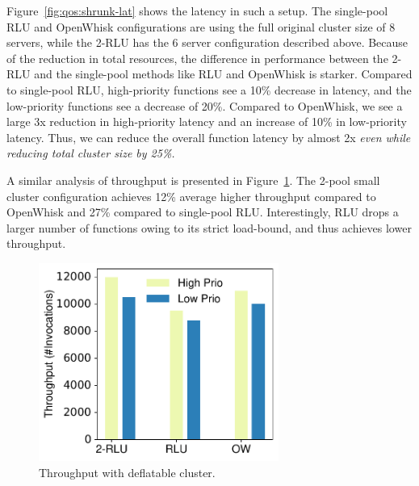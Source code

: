 Figure~\ref{fig:qos:shrunk-lat} shows the latency in such a setup.
The single-pool RLU and OpenWhisk configurations are using the full original cluster size of 8 servers, while the 2-RLU has the 6 server configuration described above. 
Because of the reduction in total resources, the difference in performance between the 2-RLU and the single-pool methods like RLU and OpenWhisk is starker.
Compared to single-pool RLU, high-priority functions see a  10\% decrease in latency, and the low-priority functions see a decrease of 20\%.
Compared to OpenWhisk, we see a large 3x reduction in high-priority latency and an increase of 10\% in low-priority latency.
Thus, we can reduce the overall function latency by almost 2x \emph{even while reducing total cluster size by 25\%.}


A similar analysis of throughput is presented in Figure~\ref{fig:qos:shrunk-tput}. 
The 2-pool small cluster configuration achieves 12\% average higher throughput compared to OpenWhisk and 27\% compared to single-pool RLU.
Interestingly, RLU drops a larger number of functions owing to its strict load-bound, and thus achieves lower throughput. 


\begin{figure}
  \centering
  \includegraphics[width=0.7\textwidth]{chrlu/qos/Figures/fixed/tput2.pdf} %
  \caption[fixed-tput]{Throughput with deflatable cluster.}
  \label{fig:qos:shrunk-tput}
\end{figure}





